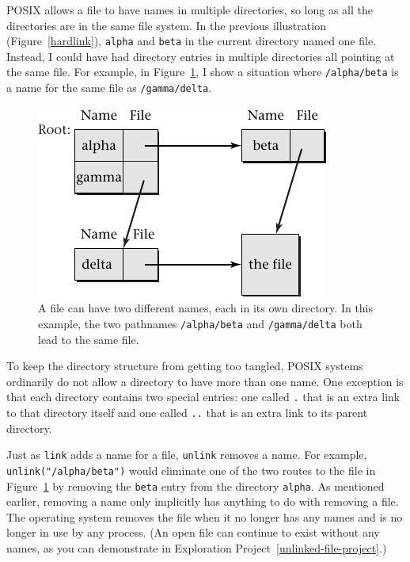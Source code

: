 POSIX allows a file to have names in multiple directories, so long as all the directories are in the same file system.  In the
previous illustration (Figure~\ref{hardlink}),
\verb|alpha| and \verb|beta| in the current directory named one
file. Instead, I could have had directory entries in multiple
directories all pointing at the same file.  For example, in
Figure~\ref{multidirhardlink}, I show a situation where
\verb|/alpha/beta| is a name for the same file as \verb|/gamma/delta|.
\begin{figure}
\centerline{\includegraphics{hail_f0816}}
\caption{A file can have two different names, each in its own
directory.  In this example, the two pathnames {\tt /alpha/beta} and
{\tt /gamma/delta} both lead to the same file.}\label{multidirhardlink}
\end{figure}

To keep the directory structure from getting too tangled, POSIX
systems ordinarily do not allow a directory to have more than one
name.  One exception is that each directory contains two special
entries: one called \verb|.| that is an extra link to that directory
itself and one called \verb|..| that is an extra link to its parent
directory.

Just as \verb|link| adds a name for a file, \verb|unlink| removes a
name.  For example, \verb|unlink("/alpha/beta")| would eliminate one of
the two routes to the file in Figure~\ref{multidirhardlink} by
removing the \verb|beta| entry from the directory \verb|alpha|.  As
mentioned earlier, removing a name only implicitly has anything to do
with removing a file.  The operating system removes the file when it
no longer has any names and is no longer in use by any process.  (An
open file can continue to exist without any names, as you can
demonstrate in Exploration Project~\ref{unlinked-file-project}.)


